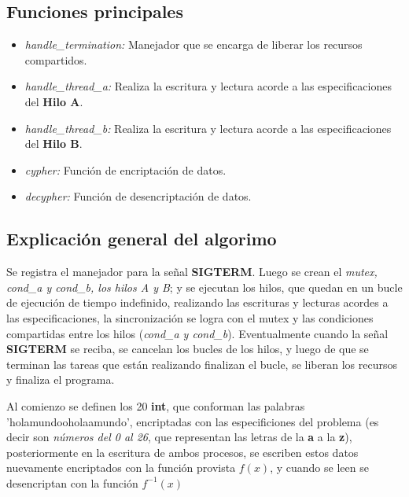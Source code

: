 \documentclass[letterpaper, 10 pt, conference]{ieeeconf}  %
\begin{document}
\subsection{Funciones principales}
\begin{itemize}
  \item \textit{handle\_termination:} Manejador que se encarga de liberar los recursos compartidos.
  \item \textit{handle\_thread\_a:} Realiza la escritura y lectura acorde a las especificaciones del \textbf{Hilo A}.
  \item \textit{handle\_thread\_b:} Realiza la escritura y lectura acorde a las especificaciones del \textbf{Hilo B}.
  \item \textit{cypher:} Función de encriptación de datos.
  \item \textit{decypher:} Función de desencriptación de datos.
\end{itemize}

\subsection{Explicación general del algorimo}
Se registra el manejador para la señal \textbf{SIGTERM}. Luego se crean el \textit{mutex, cond\_a y cond\_b, los hilos A y B}; y se ejecutan los hilos, que quedan en un bucle de ejecución de tiempo indefinido, realizando las escrituras y lecturas acordes a las especificaciones, la sincronización se logra con el mutex y las condiciones compartidas entre los hilos (\textit{cond\_a y cond\_b}). Eventualmente cuando la señal \textbf{SIGTERM} se reciba, se cancelan los bucles de los hilos, y luego de que se terminan las tareas que están realizando finalizan el bucle, se liberan los recursos y finaliza el programa.

Al comienzo se definen los 20 \textbf{int}, que conforman las palabras 'holamundooholaamundo', encriptadas con las especificiones del problema (es decir son \textit{números del 0 al 26}, que representan las letras de la \textbf{a} a la \textbf{z}), posteriormente en la escritura de ambos procesos, se escriben estos datos nuevamente encriptados con la función provista $f(x)$, y cuando se leen se desencriptan con la función $f^{-1}(x)$
\end{document}
